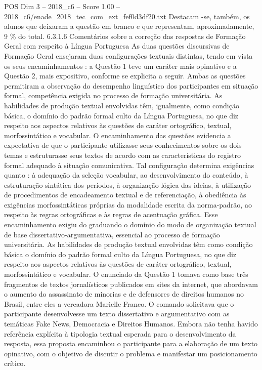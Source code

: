 \begin{textsample}{POS Dim 3 – 2018\_c6 – Score 1.00 – 2018\_c6/enade\_2018\_tec\_com\_ext\_fef0d3df20.txt}
Destacam -se, também, os alunos que deixaram a questão em branco e que representam, aproximadamente, 9 \% do total. 6.3.1.6 Comentários sobre a correção das respostas de Formação Geral com respeito à Língua Portuguesa As duas questões discursivas de Formação Geral ensejaram duas configurações textuais distintas, tendo em vista os seus encaminhamentos : a Questão 1 teve um caráter mais opinativo e a Questão 2, mais expositivo, conforme se explicita a seguir.
Ambas as questões permitiram a observação do desempenho linguístico dos participantes em situação formal, competência exigida no processo de formação universitária.
As habilidades de produção textual envolvidas têm, igualmente, como condição básica, o domínio do padrão formal culto da Língua Portuguesa, no que diz respeito aos aspectos relativos às questões de caráter ortográfico, textual, morfossintático e vocabular.
O encaminhamento das questões evidencia a expectativa de que o participante utilizasse seus conhecimentos sobre os dois temas e estruturasse seus textos de acordo com as características do registro formal adequado à situação comunicativa.
Tal configuração determina exigências quanto : à adequação da seleção vocabular, ao desenvolvimento do conteúdo, à estruturação sintática dos períodos, à organização lógica das ideias, à utilização de procedimentos de encadeamento textual e de referenciação, à obediência às exigências morfossintáticas próprias da modalidade escrita da norma-padrão, ao respeito às regras ortográficas e às regras de acentuação gráfica.
Esse encaminhamento exigiu do graduando o domínio do modo de organização textual de base dissertativo-argumentativa, essencial ao processo de formação universitária.
As habilidades de produção textual envolvidas têm como condição básica o domínio do padrão formal culto da Língua Portuguesa, no que diz respeito aos aspectos relativos às questões de caráter ortográfico, textual, morfossintático e vocabular.
O enunciado da Questão 1 tomava como base três fragmentos de textos jornalísticos publicados em sites da internet, que abordavam o aumento do assassinato de minorias e de defensores de direitos humanos no Brasil, entre eles a vereadora Marielle Franco.
O comando solicitava que o participante desenvolvesse um texto dissertativo e argumentativo com as temáticas Fake News, Democracia e Direitos Humanos.
Embora não tenha havido referência explícita à tipologia textual esperada para o desenvolvimento da resposta, essa proposta encaminhou o participante para a elaboração de um texto opinativo, com o objetivo de discutir o problema e manifestar um posicionamento crítico.

\end{textsample}

